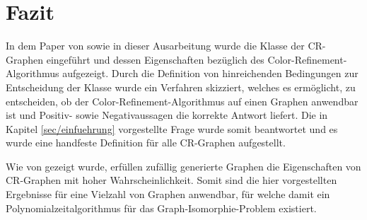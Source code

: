 \section{Fazit}
\label{sec/fazit}

In dem Paper von \cite{Arvind2015} sowie in dieser Ausarbeitung wurde die Klasse der CR-Graphen eingeführt und dessen Eigenschaften bezüglich des Color-Refinement-Algorithmus aufgezeigt.
Durch die Definition von hinreichenden Bedingungen zur Entscheidung der Klasse wurde ein Verfahren skizziert, welches es ermöglicht, zu entscheiden, ob der Color-Refinement-Algorithmus auf einen Graphen anwendbar ist und Positiv- sowie Negativaussagen die korrekte Antwort liefert. 
Die in Kapitel \ref{sec/einfuehrung} vorgestellte Frage wurde somit beantwortet und es wurde eine handfeste Definition für alle CR-Graphen aufgestellt.

Wie von \cite{Laszlo1980} gezeigt wurde, erfüllen zufällig generierte Graphen die Eigenschaften von CR-Graphen mit hoher Wahrscheinlichkeit.
Somit sind die hier vorgestellten Ergebnisse für eine Vielzahl von Graphen anwendbar, für welche damit ein Polynomialzeitalgorithmus für das Graph-Isomorphie-Problem existiert.
